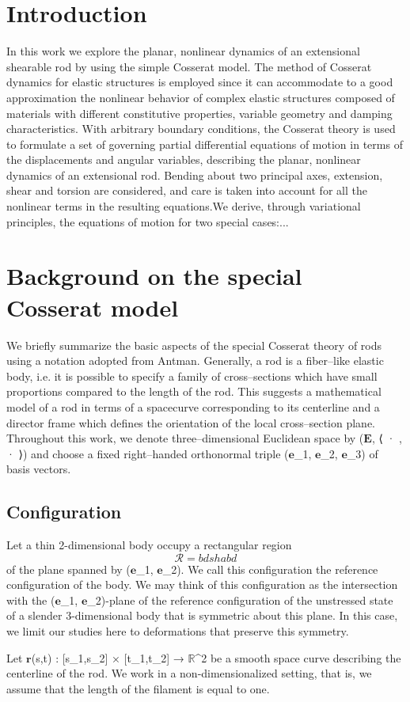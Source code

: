 \documentclass[12pt]{article}
\begin{document}
\section{Introduction}
In this work we explore the planar, nonlinear dynamics of an extensional shearable rod by using the simple Cosserat model. The method of Cosserat dynamics for elastic structures is employed since it can accommodate to a good approximation the nonlinear behavior of complex elastic structures composed of materials with different constitutive properties, variable geometry and damping characteristics. With arbitrary boundary conditions, the Cosserat theory is used to formulate a set of governing partial differential equations of motion in terms of the displacements and angular variables, describing the planar, nonlinear dynamics of an extensional rod. Bending about two principal axes, extension, shear and torsion are considered, and care is taken into account for all the nonlinear terms in the resulting equations.We derive, through variational principles, the equations of motion for two special cases:...

\section{Background on the special Cosserat model}
We briefly summarize the basic aspects of the special Cosserat theory of rods using a notation adopted from Antman. Generally, a rod is a fiber–like elastic body, i.e. it is possible to specify a family of cross–sections which have small proportions compared to the length of the rod. This suggests a mathematical model of a rod in terms of a spacecurve corresponding to its centerline and a director frame which defines the orientation of the local cross–section plane.
Throughout this work, we denote three–dimensional Euclidean space by ($\mathbf{E}$, ⟨ · , · ⟩) and choose a fixed right–handed orthonormal triple ($\mathbf{e}$_1, $\mathbf{e}$_2, $\mathbf{e}$_3) of basis vectors.

\subsection{Configuration}
Let a thin 2-dimensional body occupy a rectangular region
\[  \mathcal{R}= bdshabd \]
of the plane spanned by ($\mathbf{e}$_1, $\mathbf{e}$_2). We call this configuration the reference configuration of the body.
We may think of this configuration as the intersection with the ($\mathbf{e}$_1, $\mathbf{e}$_2)-plane of the reference configuration of the unstressed state of a slender 3-dimensional body that is symmetric about this plane. In this case, we limit our studies here to deformations that preserve this symmetry.


Let $\mathbf{r}$(s,t) : [s_1,s_2] × [t_1,t_2] → $\mathbb{R}$^2 be a smooth space curve describing the centerline of the rod.
We work in a non-dimensionalized setting, that is, we assume that the length of the filament is equal to one.
\end{document}
